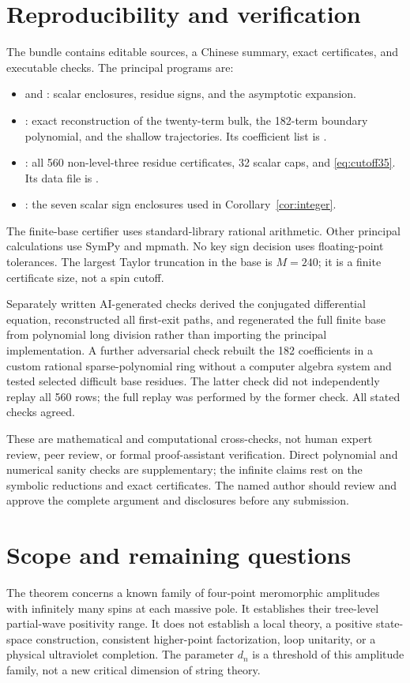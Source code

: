 \documentclass[11pt,a4paper]{article}
\theoremstyle{remark}\newtheorem{remark}[theorem]{Remark}
\begin{document}
\section{Reproducibility and verification}
The bundle contains editable sources, a Chinese summary, exact certificates, and executable checks. The principal programs are:
\begin{itemize}
\item {} and : scalar enclosures, residue signs, and the asymptotic expansion.
\item {}: exact reconstruction of the twenty-term bulk, the 182-term boundary polynomial, and the shallow trajectories. Its coefficient list is .
\item {}: all 560 non-level-three residue certificates, 32 scalar caps, and \eqref{eq:cutoff35}. Its data file is .
\item {}: the seven scalar sign enclosures used in Corollary~\ref{cor:integer}.
\end{itemize}
The finite-base certifier uses standard-library rational arithmetic. Other principal calculations use SymPy and mpmath. No key sign decision uses floating-point tolerances. The largest Taylor truncation in the base is $M=240$; it is a finite certificate size, not a spin cutoff.

Separately written AI-generated checks derived the conjugated differential equation, reconstructed all first-exit paths, and regenerated the full finite base from polynomial long division rather than importing the principal implementation. A further adversarial check rebuilt the 182 coefficients in a custom rational sparse-polynomial ring without a computer algebra system and tested selected difficult base residues. The latter check did not independently replay all 560 rows; the full replay was performed by the former check. All stated checks agreed.

These are mathematical and computational cross-checks, not human expert review, peer review, or formal proof-assistant verification. Direct polynomial and numerical sanity checks are supplementary; the infinite claims rest on the symbolic reductions and exact certificates. The named author should review and approve the complete argument and disclosures before any submission.

\section{Scope and remaining questions}
The theorem concerns a known family of four-point meromorphic amplitudes with infinitely many spins at each massive pole. It establishes their tree-level partial-wave positivity range. It does not establish a local theory, a positive state-space construction, consistent higher-point factorization, loop unitarity, or a physical ultraviolet completion. The parameter $d_n$ is a threshold of this amplitude family, not a new critical dimension of string theory.
\end{document}
